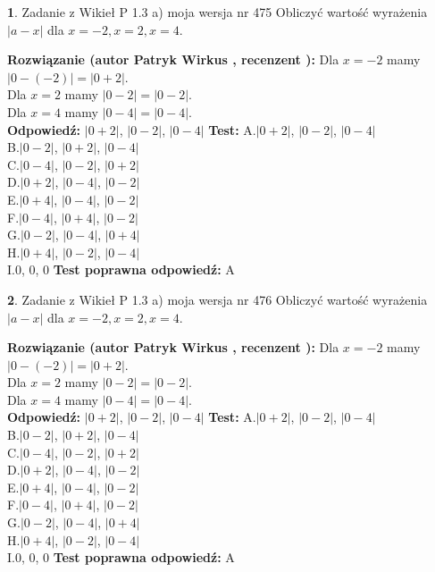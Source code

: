 \documentclass[12pt, a4paper]{article}
\theoremstyle{definition} %
\newtheorem{zad}{}
\newcommand{\zadStart}[1]{\begin{zad}#1\newline}
\newcommand{\zadStop}{\end{zad}}
\newcommand{\rozwStart}[2]{\noindent \textbf{Rozwiązanie (autor #1 , recenzent #2): }\newline}
\newcommand{\rozwStop}{\newline}
\newcommand{\odpStart}{\noindent \textbf{Odpowiedź:}\newline}
\newcommand{\odpStop}{\newline}
\newcommand{\testStart}{\noindent \textbf{Test:}\newline}
\newcommand{\testStop}{\newline}
\newcommand{\kluczStart}{\noindent \textbf{Test poprawna odpowiedź:}\newline}
\newcommand{\kluczStop}{\newline}
\begin{document}
\zadStart{Zadanie z Wikieł P 1.3 a) moja wersja nr 475}
Obliczyć wartość wyrażenia $|a - x|$ dla $x=-2,x=2,x=4$.
\zadStop
\rozwStart{Patryk Wirkus}{}
Dla $x = -2$ mamy $|0 - (-2)| = |0 + 2|$.\\
Dla $x = 2$ mamy $|0 - 2| = |0 - 2|$.\\
Dla $x = 4$ mamy $|0 - 4| = |0 - 4|$.\\
\rozwStop
\odpStart
$|0 + 2|$, $|0 - 2|$, $|0 - 4|$
\odpStop
\testStart
A.$|0 + 2|$, $|0 - 2|$, $|0 - 4|$\\
B.$|0 - 2|$, $|0 + 2|$, $|0 - 4|$\\
C.$|0 - 4|$, $|0 - 2|$, $|0 + 2|$\\
D.$|0 + 2|$, $|0 - 4|$, $|0 - 2|$\\
E.$|0 + 4|$, $|0 - 4|$, $|0 - 2|$\\
F.$|0 - 4|$, $|0 + 4|$, $|0 - 2|$\\
G.$|0 - 2|$, $|0 - 4|$, $|0 + 4|$\\
H.$|0 + 4|$, $|0 - 2|$, $|0 - 4|$\\
I.$0$, $0$, $0$
\testStop
\kluczStart
A
\kluczStop



\zadStart{Zadanie z Wikieł P 1.3 a) moja wersja nr 476}
Obliczyć wartość wyrażenia $|a - x|$ dla $x=-2,x=2,x=4$.
\zadStop
\rozwStart{Patryk Wirkus}{}
Dla $x = -2$ mamy $|0 - (-2)| = |0 + 2|$.\\
Dla $x = 2$ mamy $|0 - 2| = |0 - 2|$.\\
Dla $x = 4$ mamy $|0 - 4| = |0 - 4|$.\\
\rozwStop
\odpStart
$|0 + 2|$, $|0 - 2|$, $|0 - 4|$
\odpStop
\testStart
A.$|0 + 2|$, $|0 - 2|$, $|0 - 4|$\\
B.$|0 - 2|$, $|0 + 2|$, $|0 - 4|$\\
C.$|0 - 4|$, $|0 - 2|$, $|0 + 2|$\\
D.$|0 + 2|$, $|0 - 4|$, $|0 - 2|$\\
E.$|0 + 4|$, $|0 - 4|$, $|0 - 2|$\\
F.$|0 - 4|$, $|0 + 4|$, $|0 - 2|$\\
G.$|0 - 2|$, $|0 - 4|$, $|0 + 4|$\\
H.$|0 + 4|$, $|0 - 2|$, $|0 - 4|$\\
I.$0$, $0$, $0$
\testStop
\kluczStart
A
\kluczStop
\end{document}
